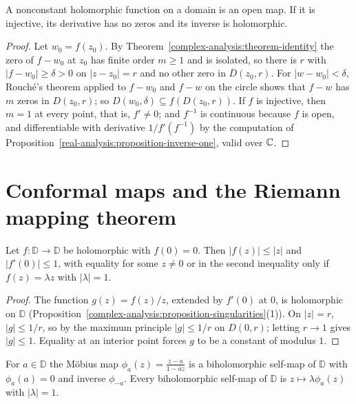 \begin{theorem}\label{complex-analysis:theorem-open-mapping}
A nonconstant holomorphic function on a domain is an open map. If it is injective, its derivative has no zeros and its inverse is holomorphic.
\end{theorem}

\begin{proof}
Let $w_0 = f(z_0)$. By Theorem~\ref{complex-analysis:theorem-identity} the zero of $f - w_0$ at $z_0$ has finite order $m \geq 1$ and is isolated, so there is $r$ with $|f - w_0| \geq \delta > 0$ on
$|z - z_0| = r$ and no other zero in $\overline{D}(z_0, r)$. For $|w - w_0| < \delta$, Rouch\'e's theorem applied to $f - w_0$ and $f - w$ on the circle shows that $f - w$ has $m$ zeros in $D(z_0, r)$; so
$D(w_0, \delta) \subseteq f(D(z_0, r))$. If $f$ is injective, then $m = 1$ at every point, that is, $f' \neq 0$; and $f^{-1}$ is continuous because $f$ is open, and differentiable with derivative $1/f'(f^{-1})$ by
the computation of Proposition~\ref{real-analysis:proposition-inverse-one}, valid over $\mathbb{C}$.
\end{proof}

\section{Conformal maps and the Riemann mapping theorem}\label{complex-analysis:section-riemann-mapping}

\begin{lemma}[Schwarz]\label{complex-analysis:lemma-schwarz}
Let $f \colon \mathbb{D} \to \mathbb{D}$ be holomorphic with $f(0) = 0$. Then $|f(z)| \leq |z|$ and $|f'(0)| \leq 1$, with equality for some $z \neq 0$ or in the second inequality only if $f(z) = \lambda z$ with
$|\lambda| = 1$.
\end{lemma}

\begin{proof}
The function $g(z) = f(z)/z$, extended by $f'(0)$ at $0$, is holomorphic on $\mathbb{D}$ (Proposition~\ref{complex-analysis:proposition-singularities}(1)). On $|z| = r$, $|g| \leq 1/r$, so by the maximum
principle $|g| \leq 1/r$ on $D(0, r)$; letting $r \to 1$ gives $|g| \leq 1$. Equality at an interior point forces $g$ to be a constant of modulus $1$.
\end{proof}

\begin{proposition}\label{complex-analysis:proposition-disc-automorphisms}
For $a \in \mathbb{D}$ the M\"obius map $\phi_a(z) = \frac{z - a}{1 - \bar az}$ is a biholomorphic self-map of $\mathbb{D}$ with $\phi_a(a) = 0$ and inverse $\phi_{-a}$. Every biholomorphic self-map of
$\mathbb{D}$ is $z \mapsto \lambda\phi_a(z)$ with $|\lambda| = 1$.
\end{proposition}

